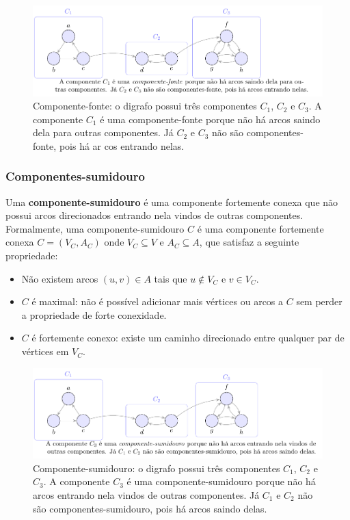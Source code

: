 \begin{figure}[H]
	\centering
	\includegraphics[width=0.9\linewidth]{figures/fig_componente_fonte.pdf}

	\caption{Componente-fonte: o digrafo possui três componentes $C_1$, $C_2$ e $C_3$. A componente $C_1$ é uma componente-fonte porque não há arcos saindo dela para outras componentes. Já $C_2$ e $C_3$ não são componentes-fonte, pois há ar  cos entrando nelas.}
	\label{fig:componente-fonte}\end{figure}


\subsubsection{Componentes-sumidouro}
Uma \textbf{componente-sumidouro} é uma componente fortemente conexa que não possui arcos direcionados entrando nela vindos de outras componentes. Formalmente, uma componente-sumidouro \(C\) é uma componente fortemente conexa \(C = (V_C, A_C)\) onde \(V_C \subseteq V\) e \(A_C \subseteq A\), que satisfaz a seguinte propriedade:
\begin{itemize}
	\item Não existem arcos \((u, v) \in A\) tais que \(u \notin V_C\) e \(v \in V_C\).
	\item \(C\) é maximal: não é possível adicionar mais vértices ou arcos a \(C\) sem perder a propriedade de forte conexidade.
	\item \(C\) é fortemente conexo: existe um caminho direcionado entre qualquer par de vértices em \(V_C\).
\end{itemize}


\begin{figure}[H]
	\centering
	\includegraphics[width=0.9\linewidth]{figures/fig_componente_sumidouro.pdf}

	\caption{Componente-sumidouro: o digrafo possui três componentes $C_1$, $C_2$ e $C_3$. A componente $C_3$ é uma componente-sumidouro porque não há arcos entrando nela vindos de outras componentes. Já $C_1$ e $C_2$ não são componentes-sumidouro, pois há arcos saindo delas.}
	\label{fig:componente-sumidouro}\end{figure}



